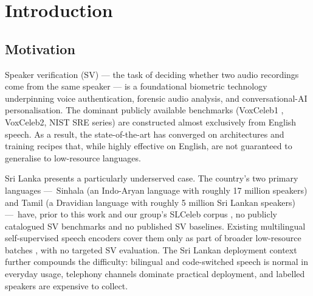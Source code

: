 
\chapter{Introduction}
\label{ch:introduction}

\section{Motivation}
\label{sec:motivation}

Speaker verification (SV) — the task of deciding whether two audio
recordings come from the same speaker — is a foundational biometric
technology underpinning voice authentication, forensic audio analysis,
and conversational-AI personalisation. The dominant publicly available
benchmarks (VoxCeleb1 \cite{nagrani2017voxceleb}, VoxCeleb2, NIST SRE
series) are constructed almost exclusively from English speech. As a
result, the state-of-the-art has converged on architectures and
training recipes that, while highly effective on English, are not
guaranteed to generalise to low-resource languages.

Sri Lanka presents a particularly underserved case. The country's two
primary languages —~Sinhala (an Indo-Aryan language with roughly
17 million speakers) and Tamil (a Dravidian language with roughly
5 million Sri Lankan speakers) —~have, prior to this work and our
group's SLCeleb corpus \cite{slceleb2025}, no publicly catalogued SV
benchmarks and no published SV baselines. Existing
multilingual self-supervised speech encoders cover them only as part
of broader low-resource batches \cite{chen2022wavlm,
baevski2020wav2vec2}, with no targeted SV evaluation. The Sri Lankan
deployment context further compounds the difficulty: bilingual and
code-switched speech is normal in everyday usage, telephony channels
dominate practical deployment, and labelled speakers are expensive to
collect.

